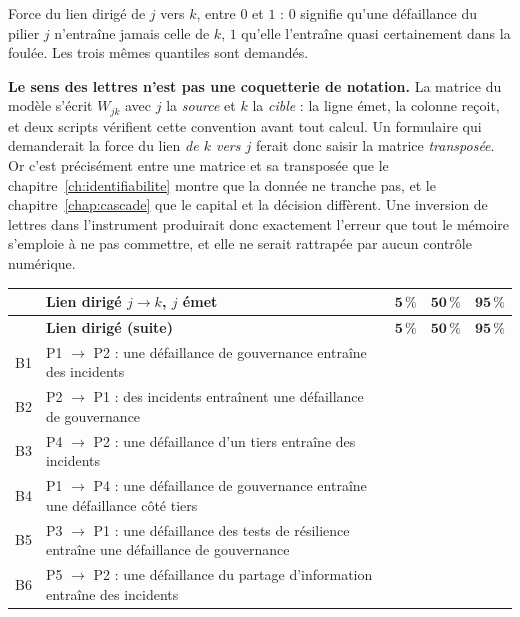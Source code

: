 Force du lien dirigé de $j$ vers $k$, entre $0$ et $1$ : $0$ signifie qu'une défaillance du
pilier $j$ n'entraîne jamais celle de $k$, $1$ qu'elle l'entraîne quasi certainement dans la
foulée. Les trois mêmes quantiles sont demandés.

\begin{attention}
\textbf{Le sens des lettres n'est pas une coquette\-rie de notation.} La matrice du modèle
s'écrit $W_{jk}$ avec $j$ la \emph{source} et $k$ la \emph{cible} : la ligne émet, la colonne
reçoit, et deux scripts vérifient cette convention avant tout calcul. Un formulaire qui
demanderait la force du lien \emph{de $k$ vers $j$} ferait donc saisir la matrice
\emph{transposée}. Or c'est précisément entre une matrice et sa transposée que le
chapitre~\ref{ch:identifiabilite} montre que la donnée ne tranche pas, et le
chapitre~\ref{chap:cascade} que le capital et la décision diffèrent. Une inversion de lettres
dans l'instrument produirait donc exactement l'erreur que tout le mémoire s'emploie à ne pas
commettre, et elle ne serait rattrapée par aucun contrôle numérique.
\end{attention}

{\small
\renewcommand{\arraystretch}{1.25}
\begin{longtable}{@{}l p{8.2cm} c c c@{}}
\toprule
& \textbf{Lien dirigé $j \rightarrow k$, $j$ émet} & $\mathbf{5\,\%}$ & $\mathbf{50\,\%}$ &
$\mathbf{95\,\%}$ \\
\midrule
\endfirsthead
\toprule
& \textbf{Lien dirigé (suite)} & $\mathbf{5\,\%}$ & $\mathbf{50\,\%}$ & $\mathbf{95\,\%}$ \\
\midrule
\endhead
B1 & P1 $\rightarrow$ P2 : une défaillance de gouvernance entraîne des incidents & & & \\
B2 & P2 $\rightarrow$ P1 : des incidents entraînent une défaillance de gouvernance & & & \\
B3 & P4 $\rightarrow$ P2 : une défaillance d'un tiers entraîne des incidents & & & \\
B4 & P1 $\rightarrow$ P4 : une défaillance de gouvernance entraîne une défaillance côté
     tiers & & & \\
B5 & P3 $\rightarrow$ P1 : une défaillance des tests de résilience entraîne une défaillance
     de gouvernance & & & \\
B6 & P5 $\rightarrow$ P2 : une défaillance du partage d'information entraîne des
     incidents & & & \\
\bottomrule
\end{longtable}}

